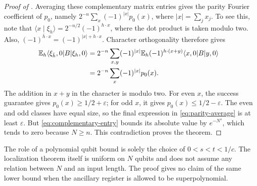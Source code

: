 \begin{proof}[Proof of ]
Averaging these complementary matrix entries gives the parity Fourier
coefficient of $p_0$, namely $2^{-n}\sum_x(-1)^{|x|}p_0(x)$,
where $|x|=\sum_jx_j$. To see this, note that
\(\langle x\mid\xi_h\rangle=2^{-n/2}(-1)^{h\cdot x}\), where
the dot product is taken modulo two. Also,
\((-1)^{\bar h\cdot x}=(-1)^{|x|+h\cdot x}\).
Character orthogonality therefore gives
\begin{align}
 \mathbb E_h\langle \xi_{\bar h},0\rvert B\lvert \xi_h,0\rangle
 &=2^{-n}\sum_{x,y}(-1)^{|x|}
   \mathbb E_h(-1)^{h\cdot(x+y)}\langle x,0\rvert B\lvert y,0\rangle\notag\\
 &=2^{-n}\sum_x(-1)^{|x|}p_0(x).
\label{eq:parity-average}
\end{align}
The addition in \(x+y\) in the character is modulo two.
For even \(x\), the success guarantee gives
\(p_0(x)\ge1/2+\varepsilon\); for odd \(x\), it gives
\(p_0(x)\le1/2-\varepsilon\).
The even and odd classes have equal size, so the final expression
in \eqref{eq:parity-average} is at least \(\varepsilon\).
But \eqref{eq:complementary-entry} bounds its absolute value by
\(e^{-N^s}\), which tends to zero because \(N\ge n\).
This contradiction proves the theorem.
\end{proof}

The role of a polynomial qubit bound is solely the choice of
\(0<s<t<1/c\). The localization theorem itself is uniform on
\(N\) qubits and does not assume any relation between \(N\) and an
input length. The proof gives no claim of the same lower bound
when the ancillary register is allowed to be superpolynomial.

